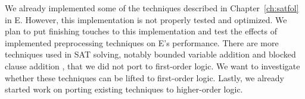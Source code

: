  We already implemented
some of the techniques described in Chapter~\ref{ch:satfol} in E. However, this
implementation is not properly tested and optimized. We plan to put finishing
touches to this implementation and test the effects of implemented preprocessing
techniques on E's performance. There are more techniques used in SAT solving,
notably bounded variable addition \cite{mhb-12-reencoding} and blocked clause
addition \cite{ok-99-er}, that we did not port to first-order logic. We want to
investigate whether these techniques can be lifted to first-order logic. Lastly,
we already started work on porting existing techniques to higher-order logic.

